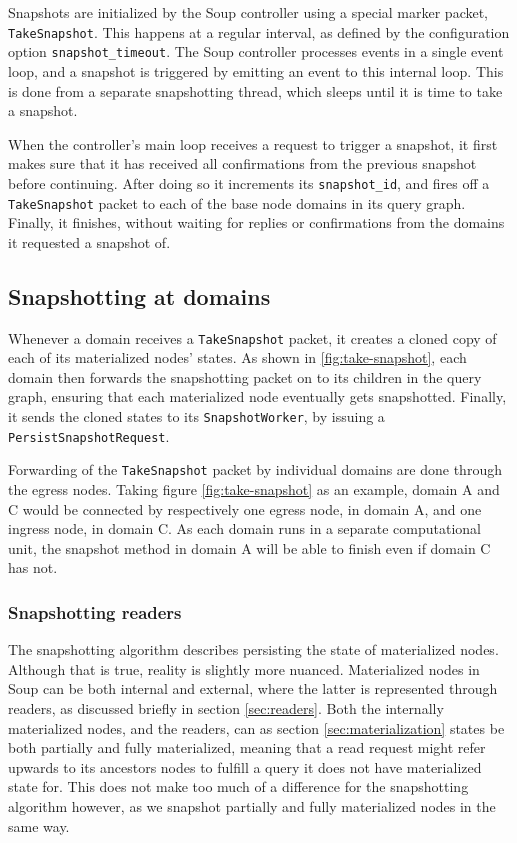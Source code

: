 \documentclass[b5paper]{report}
\begin{document}
Snapshots are initialized by the Soup controller using a special marker packet,
\texttt{TakeSnapshot}. This happens at a regular interval, as defined by the
configuration option \texttt{snapshot\_timeout}. The Soup controller processes
events in a single event loop, and a snapshot is triggered by emitting an
event to this internal loop. This is done from a separate snapshotting thread,
which sleeps until it is time to take a snapshot.

When the controller's main loop receives a request to trigger a snapshot, it
first makes sure that it has received all confirmations from the previous
snapshot before continuing. After doing so it increments its
\texttt{snapshot\_id}, and fires off a \texttt{TakeSnapshot} packet to each of
the base node domains in its query graph. Finally, it finishes, without waiting
for replies or confirmations from the domains it requested a snapshot of.

\subsection{Snapshotting at domains}
Whenever a domain receives a \texttt{TakeSnapshot} packet, it creates a cloned
copy of each of its materialized nodes' states. As shown in
\ref{fig:take-snapshot}, each domain then forwards the snapshotting packet on to
its children in the query graph, ensuring that each materialized node eventually
gets snapshotted. Finally, it sends the cloned states to its
\texttt{SnapshotWorker}, by issuing a \texttt{PersistSnapshotRequest}.

Forwarding of the \texttt{TakeSnapshot} packet by individual domains are done
through the egress nodes. Taking figure \ref{fig:take-snapshot} as an example,
domain A and C would be connected by respectively one egress node, in domain A,
and one ingress node, in domain C. As each domain runs in a separate
computational unit, the snapshot method in domain A will be able to finish even
if domain C has not.

\subsubsection{Snapshotting readers}
The snapshotting algorithm describes persisting the state of materialized nodes.
Although that is true, reality is slightly more nuanced. Materialized nodes in
Soup can be both internal and external, where the latter is represented through
readers, as discussed briefly in section \ref{sec:readers}. Both the internally
materialized nodes, and the readers, can as section \ref{sec:materialization}
states be both partially and fully materialized, meaning that a read request
might refer upwards to its ancestors nodes to fulfill a query it does not have
materialized state for. This does not make too much of a difference for the
snapshotting algorithm however, as we snapshot partially and fully materialized
nodes in the same way.
\end{document}
